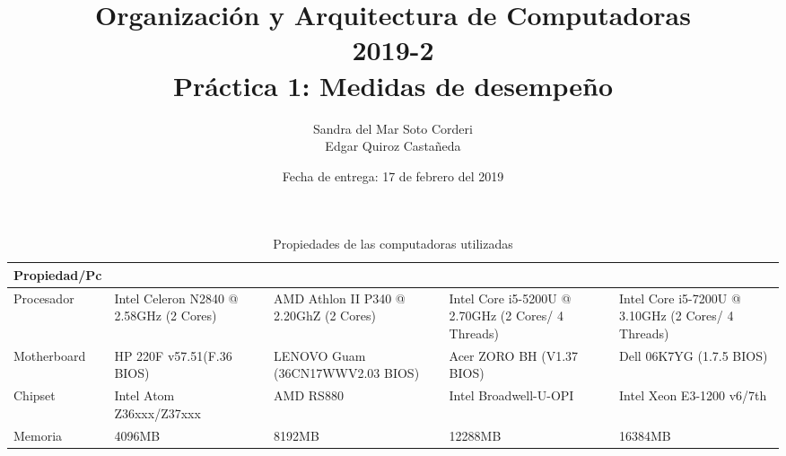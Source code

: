 \documentclass{article}
\begin{document}
    
    \title{Organización y Arquitectura de Computadoras\\
    \large 2019-2 \\
    \large Práctica 1: Medidas de desempeño}

    \date{Fecha de entrega: 17 de febrero del 2019}

    \author{Sandra del Mar Soto Corderi\\
    Edgar Quiroz Castañeda}

    \maketitle

    
\begin{table}[H]
\caption*{Propiedades de las computadoras utilizadas}
\begin{tabularx}{\linewidth}{|L|L|L|L|L|}
\hline
Propiedad/Pc                                   &  &      &                 &  \\ \hline
{}Procesador             & Intel Celeron N2840 @ 2.58GHz (2 Cores)                & AMD Athlon II P340 @ 2.20GhZ (2 Cores)                      & Intel Core i5-5200U @ 2.70GHz (2 Cores/ 4 Threads)                     & Intel Core i5-7200U @ 3.10GHz (2 Cores/ 4 Threads)       \\ \hline
{}Motherboard            & HP 220F v57.51(F.36 BIOS)                              & LENOVO Guam (36CN17WWV2.03 BIOS)                            & Acer ZORO BH (V1.37 BIOS)                                              & Dell 06K7YG (1.7.5 BIOS)                                 \\ \hline
{}Chipset                & Intel Atom Z36xxx/Z37xxx                               & AMD RS880                                                   & Intel Broadwell-U-OPI                                                  & Intel Xeon E3-1200 v6/7th                                \\ \hline
{}Memoria                & 4096MB                                                 & 8192MB                                                      & 12288MB                                                                & 16384MB                                                  \\ \hline

\end{tabularx}
\end{table}
\end{document}
